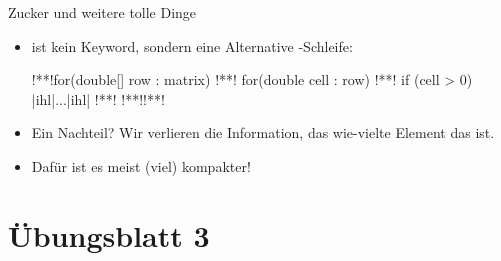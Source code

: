 {\begin{frame}[fragile]{Zucker und weitere tolle Dinge}
\SetupLstHl
\begin{itemize}[<+(1)->]
    \item {} ist kein Keyword, sondern eine Alternative -Schleife:
\begin{plainjava}
!**!for(double[] row : matrix) {
!**!    for(double cell : row) {
!**!        if (cell > 0) |ihl|...|ihl|
!**!    }
!**!}!**!
\end{plainjava}
    \item<7-> Ein Nachteil? Wir verlieren die Information, das wie-vielte Element das ist. 
    \item<9-> Dafür ist es meist (viel) kompakter!
\end{itemize}
\end{frame}
}
\fi

\section{Übungsblatt 3}
